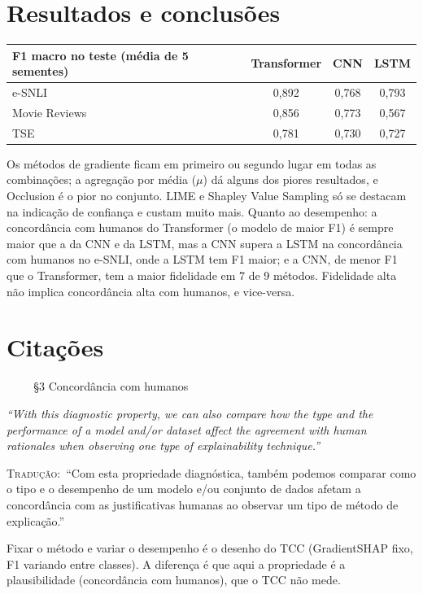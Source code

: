 \documentclass[11pt,a4paper]{article}
\newcommand{\pagechip}[1]{{\setlength{\fboxsep}{1.5pt}\colorbox{cAcc}{\textcolor{white}{\scriptsize\texttt{#1}}}}}
\newenvironment{origquote}{\par\itshape\small}{\par}
\newenvironment{tradquote}{\par\small\textsc{Tradução:}\ }{\par}
\newcommand{\explab}[1]{\par\smallskip{\small\color{cAcc}\textbf{\MakeUppercase{#1}}}\par}
\begin{document}
\section{Resultados e conclusões}
\begin{center}
\small
\begin{tabular}{lccc}
\toprule
F1 macro no teste (média de 5 sementes) & Transformer & CNN & LSTM \\
\midrule
e-SNLI & 0,892 & 0,768 & 0,793 \\
Movie Reviews & 0,856 & 0,773 & 0,567 \\
TSE & 0,781 & 0,730 & 0,727 \\
\bottomrule
\end{tabular}
\end{center}
Os métodos de gradiente ficam em primeiro ou segundo lugar em todas as combinações; a agregação por média ($\mu$) dá alguns dos piores resultados, e Occlusion é o pior no conjunto. LIME e Shapley Value Sampling só se destacam na indicação de confiança e custam muito mais. Quanto ao desempenho: a concordância com humanos do Transformer (o modelo de maior F1) é sempre maior que a da CNN e da LSTM, mas a CNN supera a LSTM na concordância com humanos no e-SNLI, onde a LSTM tem F1 maior; e a CNN, de menor F1 que o Transformer, tem a maior fidelidade em 7 de 9 métodos. Fidelidade alta não implica concordância alta com humanos, e vice-versa.

\section{Citações}

\begin{citacard}{\pagechip{p. 3} §3 Concordância com humanos}
\begin{origquote}“With this diagnostic property, we can also compare how the type and the performance of a model and/or dataset affect the agreement with human rationales when observing one type of explainability technique.”\end{origquote}
\begin{tradquote}“Com esta propriedade diagnóstica, também podemos comparar como o tipo e o desempenho de um modelo e/ou conjunto de dados afetam a concordância com as justificativas humanas ao observar um tipo de método de explicação.”\end{tradquote}
\explab{Explicação}
Fixar o método e variar o desempenho é o desenho do TCC (GradientSHAP fixo, F1 variando entre classes). A diferença é que aqui a propriedade é a plausibilidade (concordância com humanos), que o TCC não mede.
\end{citacard}
\end{document}
